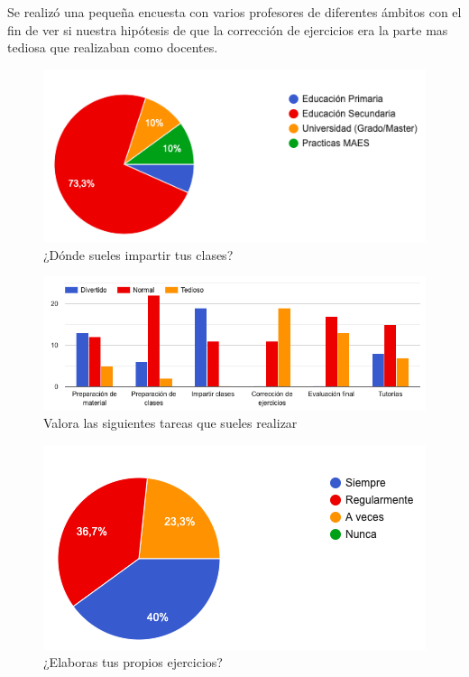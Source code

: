 Se realizó una pequeña encuesta con varios profesores de diferentes ámbitos con el fin de ver si nuestra hipótesis de que la corrección de ejercicios era la parte mas tediosa que realizaban como docentes.

\begin{figure}[h!]
\centering
\includegraphics[width=1.0\textwidth]{../images/quiz_1}
\caption{¿Dónde sueles impartir tus clases?}
\label{fig:quiz_1}
\end{figure}

\begin{figure}[h!]
\centering
\includegraphics[width=1.0\textwidth]{../images/quiz_2}
\caption{Valora las siguientes tareas que sueles realizar}
\label{fig:quiz_2}
\end{figure}


\begin{figure}[h!]
\centering
\includegraphics[width=1.0\textwidth]{../images/quiz_3}
\caption{¿Elaboras tus propios ejercicios?}
\label{fig:quiz_3}
\end{figure}



